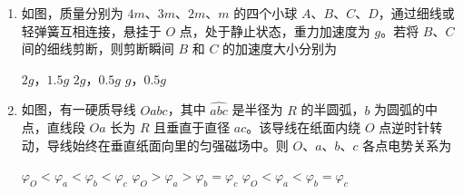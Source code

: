 \documentclass[\gkver]{gaokaozhenti}
\begin{document}
\begin{enumerate}
{B．波源的振动频率为 $f = 1 \UHz$，故波速为 $v = \lambda f = 4 \Ums$。故 B 错误；

C．质点的振动周期为 $T = 1 \Us$，因为 $0.25 \Us = T/4$，故 $B$ 点在 $t_{0} + 0.25 \Us$ 运动到平衡位置，位移为 0，速度最大，故 C 错误；

D．$0.5 \Us = T/2$，故 $A$ 点在 $t_{0} + 0.50 \Us$ 运动到波峰，位移最大，速度为 0，故 D 正确。

故选 D。
}

\item
如图，质量分别为 $4m$、$3m$、$2m$、$m$ 的四个小球 $A$、$B$、$C$、$D$，通过细线或轻弹簧互相连接，悬挂于 $O$ 点，处于静止状态，重力加速度为 $g$。若将 $B$、$C$ 间的细线剪断，则剪断瞬间 $B$ 和 $C$ 的加速度大小分别为


{$2g$，$1.5g$}
{$2g$，$0.5g$}
{$g$，$0.5g$}


\item
如图，有一硬质导线 $Oabc$，其中 $\widehat{abc}$ 是半径为 $R$ 的半圆弧，$b$ 为圆弧的中点，直线段 $Oa$ 长为 $R$ 且垂直于直径 $ac$。该导线在纸面内绕 $O$ 点逆时针转动，导线始终在垂直纸面向里的匀强磁场中。则 $O$、$a$、$b$、$c$ 各点电势关系为


{$\varphi_{O} < \varphi_{a} < \varphi_{b} < \varphi_{c}$}
{$\varphi_{O} > \varphi_{a} > \varphi_{b} = \varphi_{c}$}
{$\varphi_{O} < \varphi_{a} < \varphi_{b} = \varphi_{c}$}

\end{enumerate}
\end{document}
